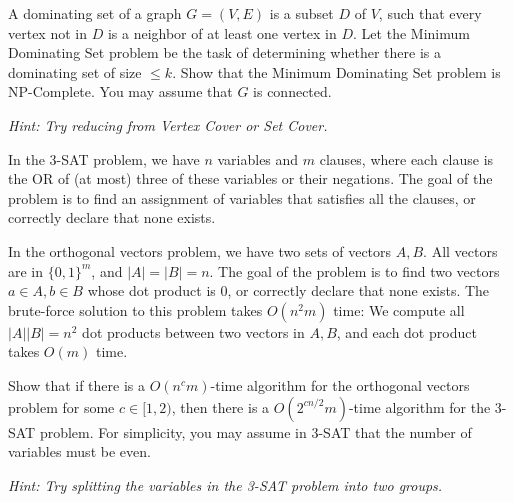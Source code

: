\documentclass[11pt]{article}
\begin{document}
\newpage


A dominating set of a graph $G = (V, E)$ is a subset $D$ of $V$, such that
every vertex not in $D$ is a neighbor of at least one vertex in
$D$. Let the Minimum Dominating Set problem be the task of determining
whether there is a dominating set of size $\leq k$. Show that the Minimum Dominating Set problem is NP-Complete. You may
assume that $G$ is connected.

\textit{Hint: Try reducing from Vertex Cover or Set Cover.}

\newpage

In the 3-SAT problem, we have $n$ variables and $m$ clauses, where each clause is the OR of (at most) three of these variables or their negations. The goal of the problem is to find an assignment of variables that satisfies all the clauses, or correctly declare that none exists.

\noindent In the orthogonal vectors problem, we have two sets of vectors $A, B$. All vectors are in $\{0, 1\}^m$, and $|A|=|B|=n$. The goal of the problem is to find two vectors $a \in A, b \in B$ whose dot product is 0, or correctly declare that none exists. The brute-force solution to this problem takes $O(n^2 m)$ time: We compute all $|A||B| = n^2$ dot products between two vectors in $A, B$, and each dot product takes $O(m)$ time.

\noindent Show that if there is a $O(n^c m)$-time algorithm for the orthogonal vectors problem for some $c \in [1, 2)$, then there is a $O(2^{cn/2} m)$-time algorithm for the 3-SAT problem. For simplicity, you may assume in 3-SAT that the number of variables must be even. 

\noindent \textit{Hint: Try splitting the variables in the 3-SAT problem into two groups.}
\end{document}
